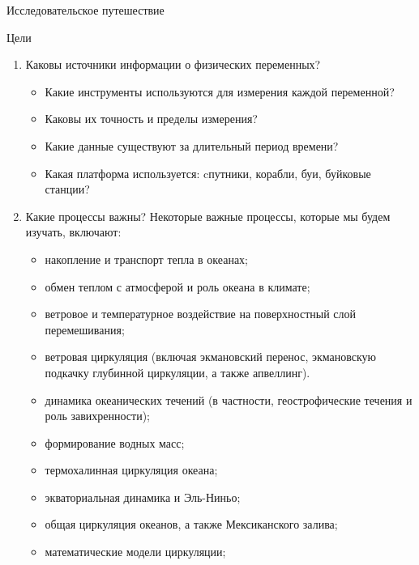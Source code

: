 \begin{chapter}{Исследовательское путешествие}
\begin{section}{Цели}
\begin{enumerate}
\item
Каковы источники информации о физических переменных?
\begin{itemize}
  \item
  Какие инструменты используются для измерения каждой переменной? 

  \item
  Каковы их точность и пределы измерения? 

  \item
  Какие данные существуют за длительный период времени? 

  \item
  Какая платформа используется: cпутники, корабли, буи, буйковые станции?
\end{itemize}

\item
Какие процессы важны? Некоторые важные процессы, которые мы будем изучать, 
включают:
\begin{itemize}
  \item
  накопление и транспорт тепла в океанах;

  \item
  обмен теплом с атмосферой и роль океана в климате; 

  \item
  ветровое и температурное воздействие на поверхностный слой перемешивания; 

  \item
  ветровая циркуляция (включая экмановский перенос, экмановскую подкачку
  глубинной циркуляции, а также апвеллинг). 

  \item
  динамика океанических течений (в частности, геострофические течения и роль 
  завихренности); 

  \item
  формирование водных масс;
  \item
  термохалинная циркуляция океана; 

  \item
  экваториальная динамика и Эль-Ниньо; 

  \item
  общая циркуляция океанов, а также Мексиканского залива; 

  \item
  математические модели циркуляции; 


\end{itemize}
\end{enumerate}
\end{section}
\end{chapter}
